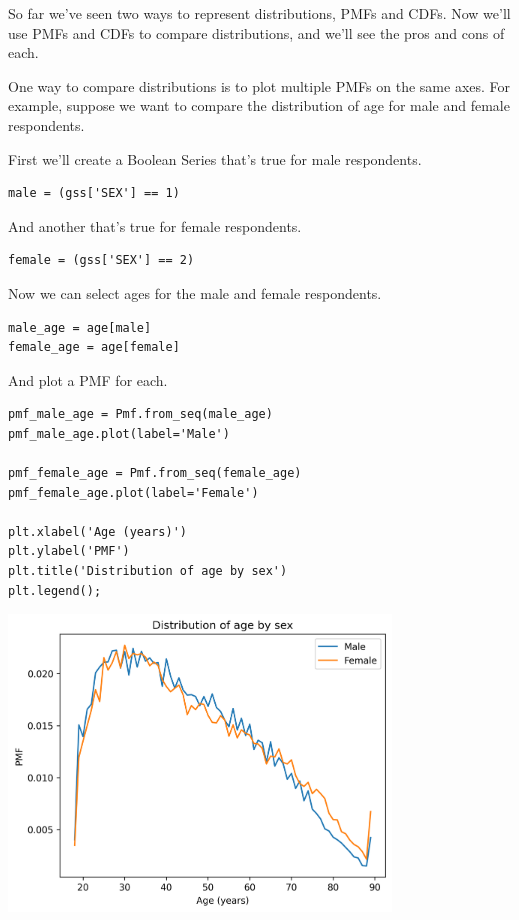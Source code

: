 So far we've seen two ways to represent distributions, PMFs and CDFs.
Now we'll use PMFs and CDFs to compare distributions, and we'll see the
pros and cons of each.

One way to compare distributions is to plot multiple PMFs on the same
axes. For example, suppose we want to compare the distribution of age
for male and female respondents.

First we'll create a Boolean Series that's true for male respondents.

\begin{lstlisting}[]
male = (gss['SEX'] == 1)
\end{lstlisting}

And another that's true for female respondents.

\begin{lstlisting}[]
female = (gss['SEX'] == 2)
\end{lstlisting}

Now we can select ages for the male and female respondents.

\begin{lstlisting}[]
male_age = age[male]
female_age = age[female]
\end{lstlisting}

And plot a PMF for each.

\begin{lstlisting}[]
pmf_male_age = Pmf.from_seq(male_age)
pmf_male_age.plot(label='Male')

pmf_female_age = Pmf.from_seq(female_age)
pmf_female_age.plot(label='Female')

plt.xlabel('Age (years)') 
plt.ylabel('PMF')
plt.title('Distribution of age by sex')
plt.legend();
\end{lstlisting}

\begin{center}
\includegraphics[width=4in]{chapters/08_distributions_files/08_distributions_88_0.png}
\end{center}

